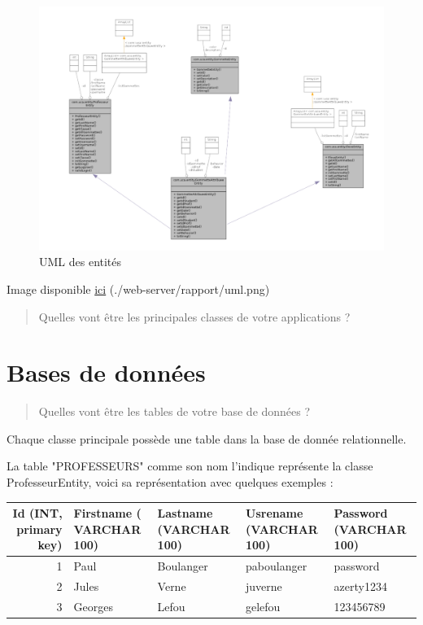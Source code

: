 \documentclass[11pt]{article}
\begin{document}
\begin{figure}[htbp]
\centering
\includegraphics[width=.9\linewidth]{./uml.png}
\caption{UML des entités}
\end{figure}

Image disponible \href{./uml.png}{ici} (./web-server/rapport/uml.png)

\begin{quote}
Quelles vont être les principales classes de votre applications ?
\end{quote}

\section{Bases de données}
\label{sec:org80b80d1}

\begin{quote}
Quelles vont être les tables de votre base de données ?
\end{quote}

Chaque classe principale possède une table dans la base de donnée relationnelle. 

La table "PROFESSEURS" comme son nom l'indique représente la classe ProfesseurEntity, voici sa représentation avec quelques exemples :


\begin{center}
\begin{tabular}{rllll}
Id (INT, primary key) & Firstname ( VARCHAR 100) & Lastname (VARCHAR 100) & Usrename (VARCHAR  100) & Password (VARCHAR 100)\\
\hline
1 & Paul & Boulanger & paboulanger & password\\
2 & Jules & Verne & juverne & azerty1234\\
3 & Georges & Lefou & gelefou & 123456789\\
\end{tabular}
\end{center}
\end{document}
